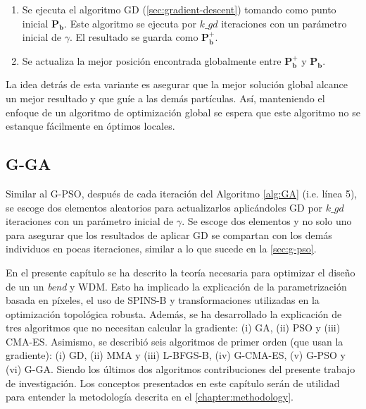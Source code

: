 \begin{enumerate}
  \item Se ejecuta el algoritmo GD (\autoref{sec:gradient-descent}) tomando como punto inicial
       $\boldsymbol{P_{b}}$. Este algoritmo se ejecuta por $k\_gd$ iteraciones con un 
       parámetro inicial de $\gamma$. El resultado se guarda como $\boldsymbol{P_{b}^{+}}$. 
  \item Se actualiza la mejor posición encontrada globalmente entre $\boldsymbol{P_{b}^{+}}$ y 
       $\boldsymbol{P_{b}}$.
\end{enumerate}

La idea detrás de esta variante es asegurar que la mejor solución global alcance un mejor resultado
y que guíe a las demás partículas.
Así, manteniendo el enfoque de un algoritmo de optimización global se espera que este algoritmo
no se estanque fácilmente en óptimos locales.


\subsection{G-GA}\label{sec:g-ga}

Similar al G-PSO, después de cada iteración del Algoritmo \ref{alg:GA} (i.e. línea 5), se escoge dos
elementos aleatorios para actualizarlos aplicándoles GD por $k\_gd$ iteraciones con un parámetro inicial
de $\gamma$.
Se escoge dos elementos y no solo uno para asegurar que los resultados de aplicar GD
se compartan con los demás individuos en pocas iteraciones, similar a lo que sucede en la \autoref{sec:g-pso}.


En el presente capítulo se ha descrito la teoría necesaria para optimizar el diseño de un
un \emph{bend} y WDM.
Esto ha implicado la explicación de la parametrización basada en píxeles,
el uso de SPINS-B y transformaciones utilizadas en la optimización topológica robusta.
Además, se ha desarrollado la explicación de tres algoritmos que no necesitan calcular la gradiente:
(i) GA, (ii) PSO y (iii) CMA-ES. Asimismo, se describió seis algoritmos de primer orden 
(que usan la gradiente): (i) GD, (ii) MMA y (iii) L-BFGS-B, (iv) G-CMA-ES, (v) G-PSO y (vi) G-GA.
Siendo los últimos dos algoritmos contribuciones del presente trabajo de investigación.
Los conceptos presentados en este capítulo serán de utilidad para entender la metodología descrita en el
\autoref{chapter:methodology}.
